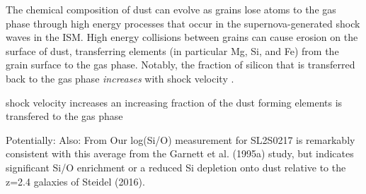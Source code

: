 \documentclass[preprint2]{aastex62}
\begin{document}
The chemical composition of dust can evolve as grains lose atoms to the gas phase through high energy processes that occur in the supernova-generated shock waves in the ISM. High energy collisions between grains can cause erosion on the surface of dust, transferring elements (in particular Mg, Si, and Fe) from the grain surface to the gas phase. Notably, the fraction of silicon that is transferred back to the gas phase \emph{increases} with shock velocity \citep[see review on depletion patterns and dust evolution in][]{Jones+2000}.

shock velocity increases an increasing fraction of the
dust forming elements is transfered to the gas phase

Potentially: \citep{Jones+2000, Sankrit+2007, Okada+2008, Giannini+2015, Haris+2016}
Also: From \citet{Berg+2018} Our log(Si/O) measurement for SL2S0217 is remarkably consistent with this average from the Garnett et al. (1995a) study, but indicates significant Si/O enrichment or a reduced Si depletion onto dust relative to the z=2.4 galaxies of Steidel (2016).



\end{document}
